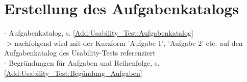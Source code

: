\section{Erstellung des Aufgabenkatalogs}
- Aufgabenkatalog, s. \autoref{Add:Usability_Test:Aufgabenkatalog}\\
-> nachfolgend wird mit der Kurzform 'Aufgabe 1', 'Aufgabe 2' etc. auf den Aufgabenkatalog des Usability-Tests referenziert\\
- Begründungen für Aufgaben und Reihenfolge, s. \autoref{Add:Usability_Test:Begündung_Aufgaben}
